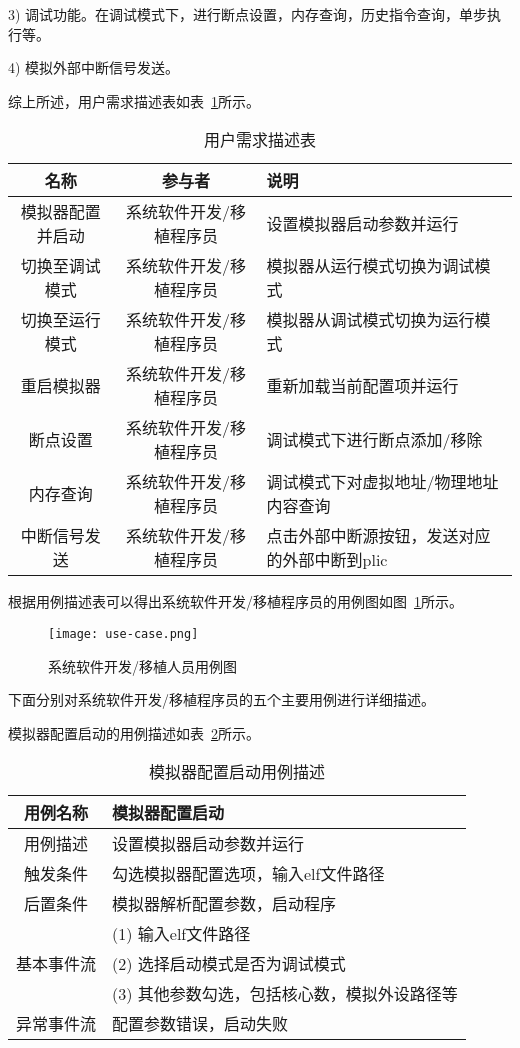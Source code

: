 3) 调试功能。在调试模式下，进行断点设置，内存查询，历史指令查询，单步执行等。


4) 模拟外部中断信号发送。


综上所述，用户需求描述表如表~\ref{tab:tab1}所示。
\begin{table}[h]
  \centering
  \caption{用户需求描述表}
  \label{tab:tab1}
  \renewcommand\arraystretch{1.2}
  \begin{tabular}{ccl}
    \toprule
    名称   & 参与者   & 说明   \\
    \midrule
    模拟器配置并启动 & 系统软件开发/移植程序员 & \multicolumn{1}{p{5cm}}{设置模拟器启动参数并运行} \\ \hline
    切换至调试模式 &	系统软件开发/移植程序员	& \multicolumn{1}{m{5cm}}{模拟器从运行模式切换为调试模式}\\
    \hline
    切换至运行模式 & 系统软件开发/移植程序员	& \multicolumn{1}{m{5cm}}{模拟器从调试模式切换为运行模式}\\
    \hline
    重启模拟器	& 系统软件开发/移植程序员	& \multicolumn{1}{p{5cm}}{重新加载当前配置项并运行}\\
    \hline
    断点设置 &	系统软件开发/移植程序员 &	\multicolumn{1}{p{5cm}}{调试模式下进行断点添加/移除}\\
    \hline
    内存查询 &	系统软件开发/移植程序员 &	\multicolumn{1}{m{5cm}}{调试模式下对虚拟地址/物理地址内容查询}\\
    \hline
    中断信号发送	& 系统软件开发/移植程序员 &	\multicolumn{1}{m{5cm}}{点击外部中断源按钮，发送对应的外部中断到plic}\\
    \bottomrule
  \end{tabular}
\end{table}


根据用例描述表可以得出系统软件开发/移植程序员的用例图如图~\ref{fig:use-case}所示。
\begin{figure}[h]
  \centering
  \texttt{[image: use-case.png]}
  \caption{系统软件开发/移植人员用例图}
  \label{fig:use-case}
\end{figure}


下面分别对系统软件开发/移植程序员的五个主要用例进行详细描述。 


模拟器配置启动的用例描述如表~\ref{tab:yongli1}所示。
\begin{table}[h]
  \centering
  \caption{模拟器配置启动用例描述}
  \label{tab:yongli1}
  \renewcommand\arraystretch{1.1}
  \begin{tabular}{cl}
    \toprule
用例名称 &	模拟器配置启动\\
    \midrule
用例描述 &	设置模拟器启动参数并运行\\ \hline
触发条件 &	勾选模拟器配置选项，输入elf文件路径\\ \hline
后置条件 &	模拟器解析配置参数，启动程序\\ \hline
	& (1)	输入elf文件路径 \\
  基本事件流 & (2)	选择启动模式是否为调试模式 \\
 & (3)	其他参数勾选，包括核心数，模拟外设路径等\\ \hline
异常事件流	& 配置参数错误，启动失败\\
    \bottomrule
  \end{tabular}
\end{table}


